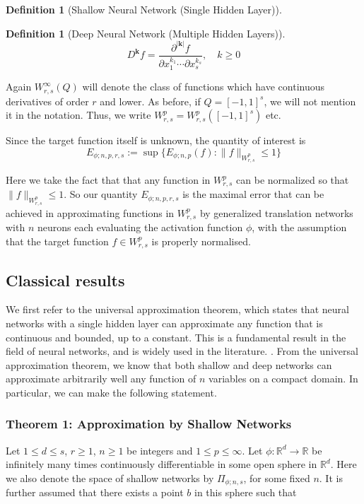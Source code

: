 \documentclass[11pt,a4paper]{article}
\theoremstyle{plain}
\theoremstyle{definition}
\newtheorem{definition}[theorem]{Definition}
\theoremstyle{remark}
\begin{document}
\begin{definition}[Shallow Neural Network (Single Hidden Layer)]
\begin{definition}[Deep Neural Network (Multiple Hidden Layers)]
\[
    D^{\mathbf{k} }f = \frac{\partial^{|\mathbf{k} |} f}{\partial x_1^{k_1} \cdots \partial x_s^{k_s}}, \quad k \geq 0
\]

Again \(W^{\infty }_{r,s}(Q)\) will denote the class of functions which have continuous derivatives of order \(r\) and lower. As before, if \(Q = [-1, 1]^s\), we will not mention it in the notation. Thus, we write \(W^p_{r,s} = W^p_{r,s}([-1, 1]^s)\) etc.

Since the target function itself is unknown, the quantity of interest is
\[
    E_{\phi ; n,p,r,s} := \sup\{E_{\phi ; n,p}(f) : \|f\|_{W^p_{r,s}} \leq 1\}
\]

Here we take the fact that that any function in \(W^p_{r,s}\) can be normalized so that \( \|f\|_{W^p_{r,s}} \leq 1 \). So our quantity \(E_{\phi ; n,p,r,s}\) is the maximal error that can be achieved in approximating functions in \(W^p_{r,s}\) by generalized translation networks with \(n\) neurons each evaluating the activation function \(\phi \), with the assumption that the target function \(f \in W^p_{r,s}\) is properly normalised.



\subsection{Classical results}

We first refer to the universal approximation theorem, which states that neural networks with a single hidden layer can approximate any function that is continuous and bounded, up to a constant. This is a fundamental result in the field of neural networks, and is widely used in the literature. \cite{goodfellow2016deep}.
From the universal approximation theorem, we know that both shallow and deep networks can approximate arbitrarily well any function of \(n\) variables on a compact domain. In particular, we can make the following statement.

\subsubsection{Theorem 1: Approximation by Shallow Networks}

Let \(1 \leq d \leq s\), \(r \geq 1\), \(n \geq 1\) be integers and \(1 \leq p \leq \infty\). Let \(\phi: \mathbb{R}^d \rightarrow \mathbb{R}\) be infinitely many times continuously differentiable in some open sphere in \(\mathbb{R}^d\). Here we also denote the space of shallow networks by \(\Pi_{\phi ; n,s}\), for some fixed \(n\). It is further assumed that there exists a point \(b\) in this sphere such that


\end{definition}
\end{definition}
\end{document}
